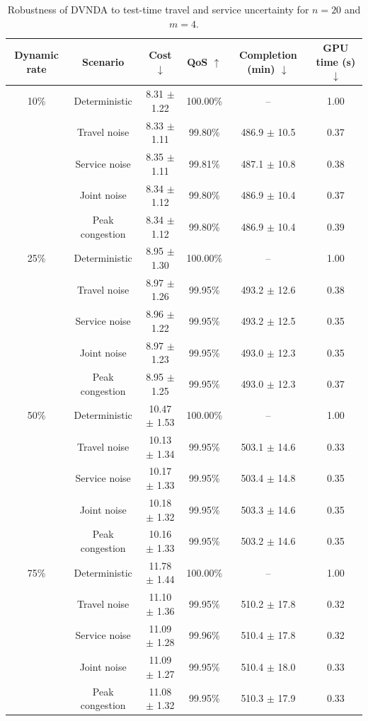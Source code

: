 \begin{table}[t]
\centering
\caption{Robustness of DVNDA to test-time travel and service uncertainty for $n=20$ and $m=4$.}
\label{tab:execution_uncertainty_n20}
\begin{tabular}{cccccc}
\toprule
Dynamic rate & Scenario & Cost $\downarrow$ & QoS $\uparrow$ & Completion (min) $\downarrow$ & GPU time (s) $\downarrow$ \\
\midrule
10\% & Deterministic & 8.31 $\pm$ 1.22 & 100.00\% & -- & 1.00 \\
 & Travel noise & 8.33 $\pm$ 1.11 & 99.80\% & 486.9 $\pm$ 10.5 & 0.37 \\
 & Service noise & 8.35 $\pm$ 1.11 & 99.81\% & 487.1 $\pm$ 10.8 & 0.38 \\
 & Joint noise & 8.34 $\pm$ 1.12 & 99.80\% & 486.9 $\pm$ 10.4 & 0.37 \\
 & Peak congestion & 8.34 $\pm$ 1.12 & 99.80\% & 486.9 $\pm$ 10.4 & 0.39 \\
\midrule
25\% & Deterministic & 8.95 $\pm$ 1.30 & 100.00\% & -- & 1.00 \\
 & Travel noise & 8.97 $\pm$ 1.26 & 99.95\% & 493.2 $\pm$ 12.6 & 0.38 \\
 & Service noise & 8.96 $\pm$ 1.22 & 99.95\% & 493.2 $\pm$ 12.5 & 0.35 \\
 & Joint noise & 8.97 $\pm$ 1.23 & 99.95\% & 493.0 $\pm$ 12.3 & 0.35 \\
 & Peak congestion & 8.95 $\pm$ 1.25 & 99.95\% & 493.0 $\pm$ 12.3 & 0.37 \\
\midrule
50\% & Deterministic & 10.47 $\pm$ 1.53 & 100.00\% & -- & 1.00 \\
 & Travel noise & 10.13 $\pm$ 1.34 & 99.95\% & 503.1 $\pm$ 14.6 & 0.33 \\
 & Service noise & 10.17 $\pm$ 1.33 & 99.95\% & 503.4 $\pm$ 14.8 & 0.35 \\
 & Joint noise & 10.18 $\pm$ 1.32 & 99.95\% & 503.3 $\pm$ 14.6 & 0.35 \\
 & Peak congestion & 10.16 $\pm$ 1.33 & 99.95\% & 503.2 $\pm$ 14.6 & 0.35 \\
\midrule
75\% & Deterministic & 11.78 $\pm$ 1.44 & 100.00\% & -- & 1.00 \\
 & Travel noise & 11.10 $\pm$ 1.36 & 99.95\% & 510.2 $\pm$ 17.8 & 0.32 \\
 & Service noise & 11.09 $\pm$ 1.28 & 99.96\% & 510.4 $\pm$ 17.8 & 0.32 \\
 & Joint noise & 11.09 $\pm$ 1.27 & 99.95\% & 510.4 $\pm$ 18.0 & 0.33 \\
 & Peak congestion & 11.08 $\pm$ 1.32 & 99.95\% & 510.3 $\pm$ 17.9 & 0.33 \\
\bottomrule
\end{tabular}
\end{table}
